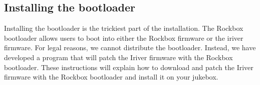 \subsection{Installing the bootloader}
  Installing the bootloader is the trickiest part of the installation.
  The Rockbox bootloader allows users to boot into either the Rockbox 
  firmware or the iriver firmware. For legal reasons, we cannot distribute 
  the bootloader. Instead, we have developed a program that will patch the 
  Iriver firmware with the Rockbox bootloader. These instructions will explain 
  how to download and patch the Iriver firmware with the Rockbox bootloader 
  and install it on your jukebox.

